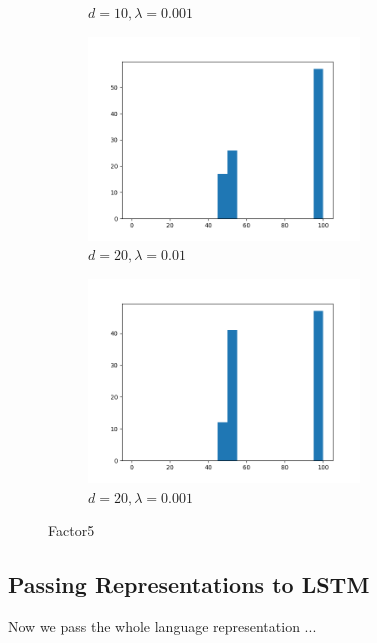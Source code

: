\documentclass[titlepage]{report}
\begin{document}
\begin{figure}[H]
\begin{subfigure}{7cm}
\caption{$d = 10, \lambda = 0.001$}
\end{subfigure}
\begin{subfigure}{7cm}
\centering\includegraphics[width = 72mm]{figures/histograms/factor5/manual/20-01}
\caption{$d = 20, \lambda = 0.01$}
\end{subfigure}
\begin{subfigure}{7cm}
\centering\includegraphics[width = 72mm]{figures/histograms/factor5/manual/20-001}
\caption{$d = 20, \lambda = 0.001$}
\end{subfigure}
\caption{Factor5}
\end{figure}

\subsection{Passing Representations to LSTM}

Now we pass the whole language representation ...
\end{document}
